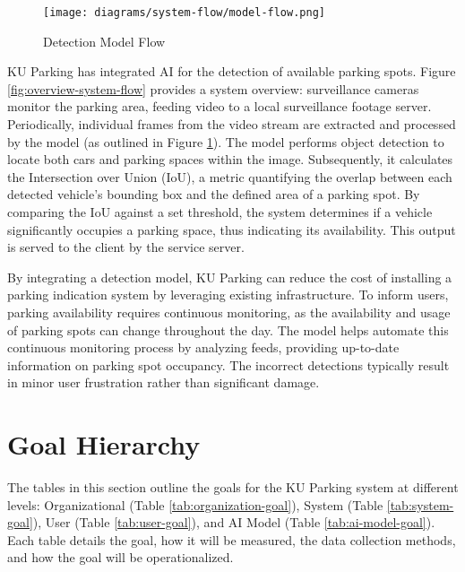 \begin{figure}[H]
    \centering
    \texttt{[image: diagrams/system-flow/model-flow.png]}
    \caption{Detection Model Flow}
    \label{fig:model-flow}
\end{figure}


KU Parking has integrated AI for the detection of available parking spots. Figure \ref{fig:overview-system-flow} provides a system overview: surveillance cameras monitor the parking area, feeding video to a local surveillance footage server. Periodically, individual frames from the video stream are extracted and processed by the model (as outlined in Figure \ref{fig:model-flow}). The model performs object detection to locate both cars and parking spaces within the image. Subsequently, it calculates the Intersection over Union (IoU), a metric quantifying the overlap between each detected vehicle's bounding box and the defined area of a parking spot. By comparing the IoU against a set threshold, the system determines if a vehicle significantly occupies a parking space, thus indicating its availability. This output is served to the client by the service server.

By integrating a detection model, KU Parking can reduce the cost of installing a parking indication system by leveraging existing infrastructure. To inform users, parking availability requires continuous monitoring, as the availability and usage of parking spots can change throughout the day. The model helps automate this continuous monitoring process by analyzing feeds, providing up-to-date information on parking spot occupancy. The incorrect detections typically result in minor user frustration rather than significant damage.

\clearpage
\section{Goal Hierarchy}
\label{section:goal-hierarchy}

The tables in this section outline the goals for the KU Parking system at different levels: Organizational (Table \ref{tab:organization-goal}), System (Table \ref{tab:system-goal}), User (Table \ref{tab:user-goal}), and AI Model (Table \ref{tab:ai-model-goal}). Each table details the goal, how it will be measured, the data collection methods, and how the goal will be operationalized.

